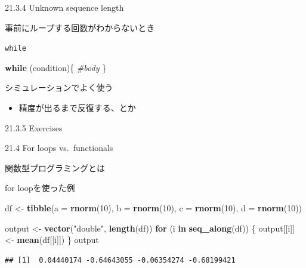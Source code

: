 \documentclass[ignorenonframetext,]{beamer}
\newenvironment{Shaded}{\begin{snugshade}}{\end{snugshade}}
\newcommand{\KeywordTok}[1]{\textcolor[rgb]{0.13,0.29,0.53}{\textbf{#1}}}
\newcommand{\DataTypeTok}[1]{\textcolor[rgb]{0.13,0.29,0.53}{#1}}
\newcommand{\DecValTok}[1]{\textcolor[rgb]{0.00,0.00,0.81}{#1}}
\newcommand{\StringTok}[1]{\textcolor[rgb]{0.31,0.60,0.02}{#1}}
\newcommand{\CommentTok}[1]{\textcolor[rgb]{0.56,0.35,0.01}{\textit{#1}}}
\newcommand{\ControlFlowTok}[1]{\textcolor[rgb]{0.13,0.29,0.53}{\textbf{#1}}}
\newcommand{\NormalTok}[1]{#1}
\providecommand{\tightlist}{%
  \setlength{\itemsep}{0pt}\setlength{\parskip}{0pt}}
\begin{document}
\begin{frame}{21.3.4 Unknown sequence length}

事前にループする回数がわからないとき

\end{frame}

\begin{frame}[fragile]{\texttt{while}}

\begin{Shaded}
\begin{Highlighting}[]
\ControlFlowTok{while}\NormalTok{ (condition)\{}
  \CommentTok{#body}
\NormalTok{\}}
\end{Highlighting}
\end{Shaded}

シミュレーションでよく使う

\begin{itemize}
\tightlist
\item
  精度が出るまで反復する、とか
\end{itemize}

\end{frame}

\begin{frame}{21.3.5 Exercises}

\end{frame}

\begin{frame}{21.4 For loops vs.~functionals}

関数型プログラミングとは

\end{frame}

\begin{frame}[fragile]{for loopを使った例}

\begin{Shaded}
\begin{Highlighting}[]
\NormalTok{df <-}\StringTok{ }\KeywordTok{tibble}\NormalTok{(}\DataTypeTok{a =} \KeywordTok{rnorm}\NormalTok{(}\DecValTok{10}\NormalTok{),}
         \DataTypeTok{b =} \KeywordTok{rnorm}\NormalTok{(}\DecValTok{10}\NormalTok{),}
         \DataTypeTok{c =} \KeywordTok{rnorm}\NormalTok{(}\DecValTok{10}\NormalTok{),}
         \DataTypeTok{d =} \KeywordTok{rnorm}\NormalTok{(}\DecValTok{10}\NormalTok{))}

\NormalTok{output <-}\StringTok{ }\KeywordTok{vector}\NormalTok{(}\StringTok{"double"}\NormalTok{, }\KeywordTok{length}\NormalTok{(df))}
\ControlFlowTok{for}\NormalTok{ (i }\ControlFlowTok{in} \KeywordTok{seq_along}\NormalTok{(df)) \{}
\NormalTok{    output[[i]] <-}\StringTok{ }\KeywordTok{mean}\NormalTok{(df[[i]])}
\NormalTok{\}}
\NormalTok{output}
\end{Highlighting}
\end{Shaded}

\begin{verbatim}
## [1]  0.04440174 -0.64643055 -0.06354274 -0.68199421
\end{verbatim}

\end{frame}
\end{document}
